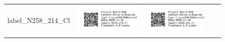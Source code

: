\documentclass[10pt,notitlepage,letterpaper]{article}
\def\s{\phantom{xx}}
\def\w{1.27in}
\def\h{-0.030in}
\begin{document}
\begin{tabular}[t]{ c @{\s} c @{\s} c @{\s} c @{\s} c }
{label_N258_214_Cl} & \includegraphics[width=\w]{label_N259_239_Cl} & \includegraphics[width=\w]{label_N260_261_Cl} \\[\h]

\end{tabular}
\end{document}

